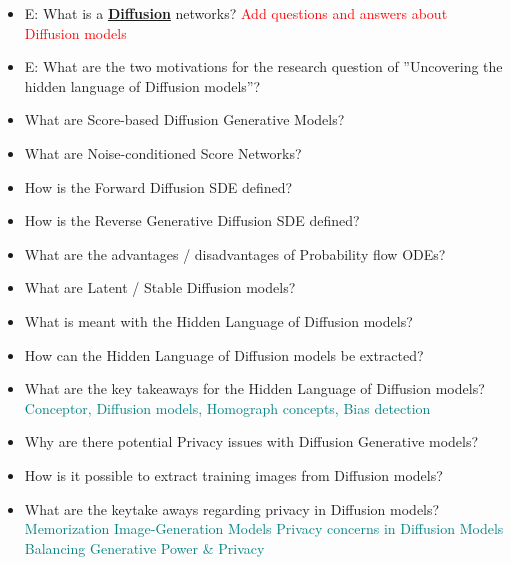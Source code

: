 \documentclass{report}
\newcommand{\asw}[2][teal]{}
\renewcommand{\asw}[2][teal]{\textcolor{#1}{#2}}
\newcommand{\qst}[2][red]{\textcolor{#1}{#2}}
\begin{document}
\begin{itemize}
		\item E: What is a \textbf{\underline{Diffusion}} networks?
		\asw{\newline \qst{Add questions and answers about Diffusion models}}
		\item E: What are the two motivations for the research question of ”Uncovering the hidden language of Diffusion models”?
		\asw{\newline }
		\item What are Score-based Diffusion Generative Models?
		\asw{\newline }
		\item What are Noise-conditioned Score Networks?
		\asw{\newline }
		\item How is the Forward Diffusion SDE defined?
		\asw{\newline }
		\item How is the Reverse Generative Diffusion SDE defined?
		\asw{\newline }
		\item What are the advantages / disadvantages of Probability flow ODEs?
		\asw{\newline }
		\item What are Latent / Stable Diffusion models?
		\asw{\newline }
		\item What is meant with the Hidden Language of Diffusion models?
		\asw{\newline }
		\item How can the Hidden Language of Diffusion models be extracted?
		\asw{\newline }
		\item What are the key takeaways for the Hidden Language of Diffusion models?
		\asw{\newline Conceptor, Diffusion models, Homograph concepts, Bias detection}
		\item Why are there potential Privacy issues with Diffusion Generative models?
		\asw{\newline }
		\item How is it possible to extract training images from Diffusion models?
		\asw{\newline }
		\item What are the keytake aways regarding privacy in Diffusion models?
		\asw{\newline Memorization Image-Generation Models
			\newline Privacy concerns in Diffusion Models
			\newline Balancing Generative Power \& Privacy}
		
	\end{itemize}
	\newpage
\end{document}
